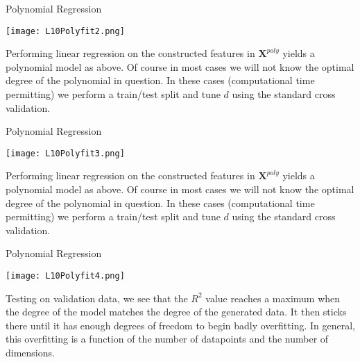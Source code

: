 \documentclass[10pt, table, dvipsnames,xcdraw, handout]{beamer}
\begin{document}
\begin{frame}[fragile]{Polynomial Regression}
  \begin{minipage}[t][0.5\textheight][t]{\textwidth}
	\centering \texttt{[image: L10Polyfit2.png]}
  \end{minipage}
  \vfill
\begin{minipage}[t][0.5\textheight][t]{\textwidth}
Performing linear regression on the constructed features in $\mathbf{X}^{poly}$ yields a polynomial model as above. \pause Of course in most cases we will not know the optimal degree of the polynomial in question. In these cases (computational time permitting) we perform a train/test split and tune $d$ using the standard cross validation.
\end{minipage}
\end{frame}



\begin{frame}[fragile]{Polynomial Regression}
  \begin{minipage}[t][0.5\textheight][t]{\textwidth}
	\centering \texttt{[image: L10Polyfit3.png]}
  \end{minipage}
  \vfill
\begin{minipage}[t][0.5\textheight][t]{\textwidth}
Performing linear regression on the constructed features in $\mathbf{X}^{poly}$ yields a polynomial model as above. \pause Of course in most cases we will not know the optimal degree of the polynomial in question. In these cases (computational time permitting) we perform a train/test split and tune $d$ using the standard cross validation.
\end{minipage}
\end{frame}



\begin{frame}[fragile]{Polynomial Regression}
  \begin{minipage}[t][0.5\textheight][t]{\textwidth}
	\centering \texttt{[image: L10Polyfit4.png]}
  \end{minipage}
  \vfill
\begin{minipage}[t][0.5\textheight][t]{\textwidth}
Testing on validation data, we see that the $R^2$ value reaches a maximum when the degree of the model matches the degree of the generated data. It then sticks there until it has enough degrees of freedom to begin badly overfitting. In general, this overfitting is a function of the number of datapoints and the number of dimensions.
\end{minipage}
\end{frame}
\end{document}
